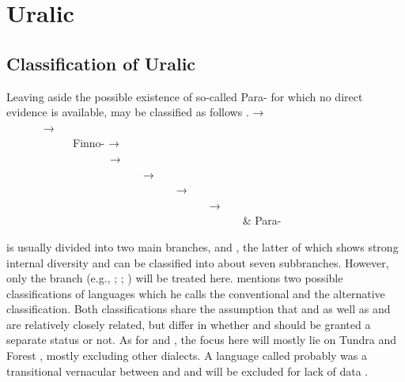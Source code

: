 \section{Uralic}\label{sec:5.12}
\subsection{Classification of Uralic}\label{sec:5.12.1}

Leaving aside the possible existence of so-called Para- for which no direct evidence is available,  may be classified as follows \citep[65]{Janhunen2009}.
\ea\upshape%
    \label{ex:ural:1} 
\noindent    
{} → \\
~~~~~~ → \\
~~~~~~~~~~~~Finno- → \\
~~~~~~~~~~~~~~~~~~ → \\
~~~~~~~~~~~~~~~~~~~~~~~~ → \\
~~~~~~~~~~~~~~~~~~~~~~~~~~~~~~ → \\
~~~~~~~~~~~~~~~~~~~~~~~~~~~~~~~~~~~~ → \\
~~~~~~~~~~~~~~~~~~~~~~~~~~~~~~~~~~~~~~~~~~ \& Para- \\
    \z

 is usually divided into two main branches,  and , the latter of which shows strong internal diversity and can be classified into about seven subbranches. However, only the  branch (e.g., \citealt{Janhunen1977}; \citeyear{Janhunen1998}; \citealt{Hajdú1988}) will be treated here. \citet[459]{Janhunen1998} mentions two possible classifications of  languages which he calls the conventional and the alternative classification. Both classifications share the assumption that  and  as well as  and  are relatively closely related, but differ in whether  and  should be granted a separate status or not. As for  and , the focus here will mostly lie on Tundra  and Forest , mostly excluding other dialects. A language called  probably was a transitional vernacular between  and  and will be excluded for lack of data \citep[457]{Janhunen1998}.

